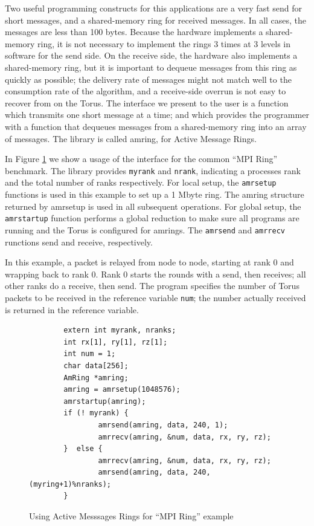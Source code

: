 \documentclass[letterpaper,twocolumn,10pt]{article}
\begin{document}
Two useful programming constructs for this applications are a very fast send for short messages, and a shared-memory ring for received
messages. In all cases, the messages are less than 100 bytes. 
Because the hardware implements a shared-memory ring, it is not necessary to implement the rings 3 times at 3 levels in software for the send side. On the receive side, the hardware also 
implements a shared-memory ring, but it is important to dequeue messages from this ring as quickly as possible; the delivery rate of messages might not match well to the consumption rate of the 
algorithm, and a receive-side overrun is not easy to recover from on the Torus. The interface we present to the user is a function which transmits one short message at a time; and which 
provides the programmer with a function that dequeues messages from a shared-memory ring into an array of messages. The library is called amring, for Active Message Rings. 

In Figure \ref{amringexample} we show a usage of the interface for the common ``MPI Ring'' benchmark. The library provides {\tt myrank} and {\tt nrank}, indicating a processes
rank and the total number of ranks respectively. For local setup, the  {\tt amrsetup} functions is used 
in this example  to set up a 1 Mbyte ring.  The amring structure returned by amrsetup is used in all subsequent operations. 
For global setup, the {\tt amrstartup} function performs a global reduction to make sure all 
programs are running and the Torus is configured for amrings. The {\tt amrsend} and {\tt amrrecv} runctions send and receive, 
respectively. 

In this example, a packet is relayed from node to node, starting at rank 0 and wrapping back to rank
0. 
Rank 0 starts the rounds with a send, then receives; all other ranks do a 
receive, then send. The program specifies the number of Torus packets to be received in the reference variable {\tt num}; the number
actually received is returned in the reference variable.

\begin{figure}
\begin{verbatim}
        extern int myrank, nranks;
        int rx[1], ry[1], rz[1];
        int num = 1;
        char data[256];
        AmRing *amring;
        amring = amrsetup(1048576);
        amrstartup(amring);
        if (! myrank) {
                amrsend(amring, data, 240, 1);
                amrrecv(amring, &num, data, rx, ry, rz);
        }  else {
                amrrecv(amring, &num, data, rx, ry, rz);
                amrsend(amring, data, 240, (myring+1)%nranks);
        }
\end{verbatim}
\caption{\label{amringexample}Using Active Messsages Rings for ``MPI Ring'' example}
\end{figure}
\end{document}
